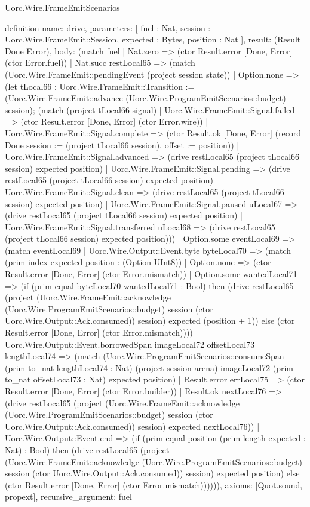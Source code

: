 \begin{lexlean}{Uorc.Wire.FrameEmitScenarios}
\begin{semanticmodule}
definition{
  name: drive,
  parameters: [
    fuel : Nat,
    session : Uorc.Wire.FrameEmit::Session,
    expected : Bytes,
    position : Nat
  ],
  result: (Result Done Error),
  body: (match fuel
    | Nat.zero => (ctor Result.error [Done, Error] (ctor Error.fuel))
    | Nat.succ restLocal65 => (match (Uorc.Wire.FrameEmit::pendingEvent (project session state))
      | Option.none => (let tLocal66 : Uorc.Wire.FrameEmit::Transition := (Uorc.Wire.FrameEmit::advance (Uorc.Wire.ProgramEmitScenarios::budget) session); (match (project tLocal66 signal)
        | Uorc.Wire.FrameEmit::Signal.failed => (ctor Result.error [Done, Error] (ctor Error.wire))
        | Uorc.Wire.FrameEmit::Signal.complete => (ctor Result.ok [Done, Error] (record Done {session := (project tLocal66 session), offset := position}))
        | Uorc.Wire.FrameEmit::Signal.advanced => (drive restLocal65 (project tLocal66 session) expected position)
        | Uorc.Wire.FrameEmit::Signal.pending => (drive restLocal65 (project tLocal66 session) expected position)
        | Uorc.Wire.FrameEmit::Signal.clean => (drive restLocal65 (project tLocal66 session) expected position)
        | Uorc.Wire.FrameEmit::Signal.paused uLocal67 => (drive restLocal65 (project tLocal66 session) expected position)
        | Uorc.Wire.FrameEmit::Signal.transferred uLocal68 => (drive restLocal65 (project tLocal66 session) expected position)))
      | Option.some eventLocal69 => (match eventLocal69
        | Uorc.Wire.Output::Event.byte byteLocal70 => (match (prim index expected position : (Option UInt8))
          | Option.none => (ctor Result.error [Done, Error] (ctor Error.mismatch))
          | Option.some wantedLocal71 => (if (prim equal byteLocal70 wantedLocal71 : Bool) then (drive restLocal65 (project (Uorc.Wire.FrameEmit::acknowledge (Uorc.Wire.ProgramEmitScenarios::budget) session (ctor Uorc.Wire.Output::Ack.consumed)) session) expected (position + 1)) else (ctor Result.error [Done, Error] (ctor Error.mismatch))))
        | Uorc.Wire.Output::Event.borrowedSpan imageLocal72 offsetLocal73 lengthLocal74 => (match (Uorc.Wire.ProgramEmitScenarios::consumeSpan (prim to_nat lengthLocal74 : Nat) (project session arena) imageLocal72 (prim to_nat offsetLocal73 : Nat) expected position)
          | Result.error errLocal75 => (ctor Result.error [Done, Error] (ctor Error.builder))
          | Result.ok nextLocal76 => (drive restLocal65 (project (Uorc.Wire.FrameEmit::acknowledge (Uorc.Wire.ProgramEmitScenarios::budget) session (ctor Uorc.Wire.Output::Ack.consumed)) session) expected nextLocal76))
        | Uorc.Wire.Output::Event.end => (if (prim equal position (prim length expected : Nat) : Bool) then (drive restLocal65 (project (Uorc.Wire.FrameEmit::acknowledge (Uorc.Wire.ProgramEmitScenarios::budget) session (ctor Uorc.Wire.Output::Ack.consumed)) session) expected position) else (ctor Result.error [Done, Error] (ctor Error.mismatch)))))),
  axioms: [Quot.sound, propext],
  recursive_argument: fuel
}


\end{semanticmodule}
\end{lexlean}
